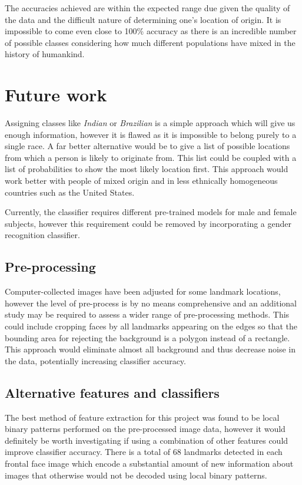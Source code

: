 The accuracies achieved are within the expected range due given the quality of
the data and the difficult nature of determining one's location of origin. It
is impossible to come even close to 100\% accuracy as there is an incredible
number of possible classes considering how much different populations have
mixed in the history of humankind. 

\section{Future work}
Assigning classes like \textit{Indian} or \textit{Brazilian} is a simple
approach which will give us enough information, however it is flawed as it is
impossible to belong purely to a single race. A far better alternative would be
to give a list of possible locations from which a person is likely to originate
from. This list could be coupled with a list of probabilities to show the most
likely location first. This approach would work better with people of mixed
origin and in less ethnically homogeneous countries such as the United States.

Currently, the classifier requires different pre-trained models for male and
female subjects, however this requirement could be removed by incorporating a
gender recognition classifier.

\subsection{Pre-processing}
Computer-collected images have been adjusted for some landmark locations,
however the level of pre-process is by no means comprehensive and an additional
study may be required to assess a wider range of pre-processing methods. This
could include cropping faces by all landmarks appearing on the edges so that
the bounding area for rejecting the background is a polygon instead of a
rectangle. This approach would eliminate almost all background and thus
decrease noise in the data, potentially increasing classifier accuracy.


\subsection{Alternative features and classifiers}
The best method of feature extraction for this project was found to be local
binary patterns performed on the pre-processed image data, however it would
definitely be worth investigating if using a combination of other features
could improve classifier accuracy. There is a total of 68 landmarks detected in
each frontal face image which encode a substantial amount of new information
about images that otherwise would not be decoded using local binary patterns.

